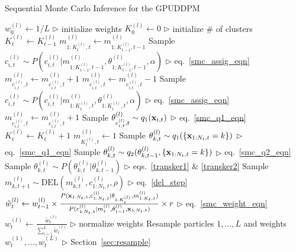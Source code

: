 \documentclass[twocolumn, final]{svjour3}
\begin{document}
\begin{algorithm}[!]
\caption{Sequential Monte Carlo Inference for the GPUDDPM}
\label{alg:SMC}
\begin{algorithmic}[1]
\STATE $w_{0}^{(l)} \leftarrow 1/L$ \hfill $\triangleright$ initialize weights
\ENDFOR
\STATE $K_{0}^{(l)} \leftarrow 0$ \hfill $\triangleright$ initialize \# of clusters
\STATE $K_{t}^{(l)}  \leftarrow K_{t-1}^{(l)}$
\STATE $m_{1:K_{t}^{(l)}, t}^{(l)} \leftarrow m_{1:K_{t-1}^{(l)}, t-1}^{(l)}$
\STATE Sample $c_{i,t}^{(l)} \sim P \left( c_{i,t}^{(l)} | m_{1:K_{t-1}^{(l)}, t-1}^{(l)}, \theta_{1:K_{t-1}^{(l)}, t-1}^{(l)}, \alpha \right)$  \hfill $\triangleright$ eq.~\eqref{smc_assig_eqn}
\STATE $m_{c_{i,t}^{(l)},t}^{(l)} \leftarrow m_{c_{i,t}^{(l)},t}^{(l)} + 1$
\ELSE
\STATE $m_{c_{i,t}^{(l)},t}^{(l)} \leftarrow m_{c_{i,t}^{(l)},t}^{(l)} - 1$
\STATE Sample $c_{i,t}^{(l)} \sim P \left( c_{i,t}^{(l)} | m_{1:K_{t}^{(l)}, t}^{(l)}, \theta_{1:K_{t}^{(l)}, t}^{(l)}, \alpha \right)$  \hfill $\triangleright$ eq.~\eqref{smc_assig_eqn}
\STATE $m_{c_{i,t}^{(l)},t}^{(l)} \leftarrow m_{c_{i,t}^{(l)},t}^{(l)} + 1$
\ENDIF
{}
\STATE Sample $\theta_{c_{i,t}^{(l)}, t}^{(l)} \sim q_{1}(\bold{x}_{i,t})$ \hfill $\triangleright$ eq.~\eqref{smc_q1_eqn}
\STATE $K_{t}^{(l)} \leftarrow K_{t}^{(l)} + 1$
\STATE $m_{K_{t}^{(l)},t}^{(l)} \leftarrow 1$
\ENDIF
\ENDFOR
{}
\STATE Sample $\theta_{k,t}^{(l)} \sim q_{1}(\{ \bold{x}_{1:N_{t}, t} = k \})$  \hfill $\triangleright$ eq.~\eqref{smc_q1_eqn}
\STATE Sample $\theta_{k,t}^{(l)} \sim q_{2}(\theta_{k,t-1}^{(l)}, \{ \bold{x}_{1:N_{t}, t} = k \})$  \hfill $\triangleright$ eq.~\eqref{smc_q2_eqn}
\STATE Sample $\theta_{k,t}^{(l)} \sim P(\theta_{k,t}^{(l)} | \theta_{k,t-1}^{(l)})$  \hfill $\triangleright$ eqs.~\eqref{transker1} $\&$ \eqref{transker2}
\ENDIF
{}
\STATE Sample $m_{k,t+1}^{(l)} \sim \text{DEL}(m_{k,t}^{(l)}, c_{1:N_{t}, t}^{(l)}, \rho)$  \hfill $\triangleright$ eq.~\eqref{del_step}
\ENDIF
\ENDFOR
\ENDFOR
\STATE $\tilde{w}_{t}^{(l)} \leftarrow w_{t-1}^{(l)} \times \frac{ P(\bold{x}_{1:N_{t},t}, c_{1:N_{t}, t}^{(l)} | \theta_{1:K_{t}^{(l)}}, m_{1:K_{t},t}^{(l)})}	{P(c_{1:N_{t}, t}^{(l)} | m_{t}^{(l)}, \theta_{t-1}^{(l)}, \bold{x}_{1:N_{t},t} ) } \times r $  \hfill $\triangleright$ eq.~\eqref{smc_weight_eqn}
\ENDFOR
{}
\STATE $w_{t}^{(l)} \leftarrow \frac{\tilde{w}_{t}^{(l)}}{\sum_{l=1}^{L} \tilde{w}_{t}^{(l)} }$   \hfill $\triangleright$ normalize weights
\ENDFOR
\STATE Resample particles $1, \ldots, L$ and weights $w_{t}^{(1)}, \ldots, w_{t}^{(L)}$   \hfill $\triangleright$ Section~\ref{sec:resample}
\ENDFOR
\end{algorithmic}
\end{algorithm}
\end{document}
